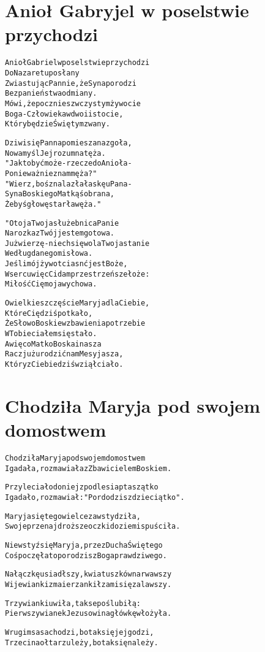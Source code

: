 \documentclass[a4paper,12pt]{article}
\begin{document}
\section*{Anioł Gabryjel w poselstwie przychodzi}

\begin{alltt}
Anioł Gabriel w poselstwie przychodzi 
Do Nazaretu posłany
Zwiastując Pannie, że Syna porodzi 
Bez panieństwa odmiany.
Mówi, że poczniesz w czystym żywocie 
Boga-Człowieka w dwoi istocie,
Który będzie Świętym zwany.

Dziwi się Panna pomieszana zgoła,
Nowa myśl Jej rozum natęża.
"Jak to być może - rzecze do Anioła - 
Ponieważ nie znam męża?"
"Wierz, boś znalazła łaskę u Pana - 
Syna Boskiego Matkąś obrana,
Żebyś głowę starła węża."

"Oto ja Twoja służebnica Panie 
Na rozkaz Twój jestem gotowa.
Już wierzę - niech się wola Twoja stanie 
Według danego mi słowa.
Jeśli mój żywot ciasnć jest Boże, 
W sercu więc Ci dam przestrzeńsze łoże:
Miłość Cię moja wychowa.

O wielkie szczęście Maryja dla Ciebie, 
Które Cię dziś potkało,
Że Słowo Boskie w zbawienia potrzebie 
W Tobie ciałem się stało.
A więc o Matko Boska i nasza 
Racz już urodzić nam Mesyjasza,
Który z Ciebie dziś wziął ciało.
\end{alltt}


\section*{Chodziła Maryja pod swojem domostwem}
\begin{alltt}
Chodziła Maryja pod swojem domostwem
I gadała, rozmawiała z Zbawicielem Boskiem.

Przyleciało do niej z podlesia ptaszątko
I gadało, rozmawiał: "Pordodzisz dzieciątko".

Maryja się tego wielce zawstydziła,
Swoje przenajdroższe oczki do ziemi spuściła.

Nie wstyź się Maryja, prze z Ducha Świętego
Coś poczęła to porodzisz Boga prawdziwego.

Na łączkę usiadłszy, kwiatuszków narwawszy
Wije wianki z maierzanki łzami się zalawszy.

Trzy wianki uwiła, tak se poślubiłą:
Pierwszy wianek Jezusowi na główkę włożyła.

W rugim sasa chodzi, bo tak się jej godzi, 
Trzeci na ołtarzu leży, bo tak się należy.

\end{alltt}
\end{document}
